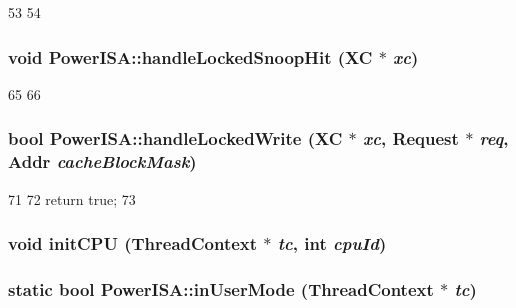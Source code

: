 \begin{DoxyCode}
53 {
54 }
\end{DoxyCode}
\hypertarget{namespacePowerISA_a00b74daf755bc384492e358e2513c483}{
\subsubsection[{handleLockedSnoopHit}]{\setlength{\rightskip}{0pt plus 5cm}void PowerISA::handleLockedSnoopHit (XC $\ast$ {\em xc})}}
\label{namespacePowerISA_a00b74daf755bc384492e358e2513c483}



\begin{DoxyCode}
65 {
66 }
\end{DoxyCode}
\hypertarget{namespacePowerISA_a48135f3506457de36b02058e971a04ea}{
\subsubsection[{handleLockedWrite}]{\setlength{\rightskip}{0pt plus 5cm}bool PowerISA::handleLockedWrite (XC $\ast$ {\em xc}, \/  {\bf Request} $\ast$ {\em req}, \/  {\bf Addr} {\em cacheBlockMask})}}
\label{namespacePowerISA_a48135f3506457de36b02058e971a04ea}



\begin{DoxyCode}
71 {
72     return true;
73 }
\end{DoxyCode}
\hypertarget{namespacePowerISA_aded557a1e716c6f849b0e0b05fc77676}{
\subsubsection[{initCPU}]{\setlength{\rightskip}{0pt plus 5cm}void initCPU ({\bf ThreadContext} $\ast$ {\em tc}, \/  int {\em cpuId})}}
\label{namespacePowerISA_aded557a1e716c6f849b0e0b05fc77676}
\hypertarget{namespacePowerISA_a73a1fd5ee3c94bf74abe6187141ba21f}{
\subsubsection[{inUserMode}]{\setlength{\rightskip}{0pt plus 5cm}static bool PowerISA::inUserMode ({\bf ThreadContext} $\ast$ {\em tc})}}
\label{namespacePowerISA_a73a1fd5ee3c94bf74abe6187141ba21f}



